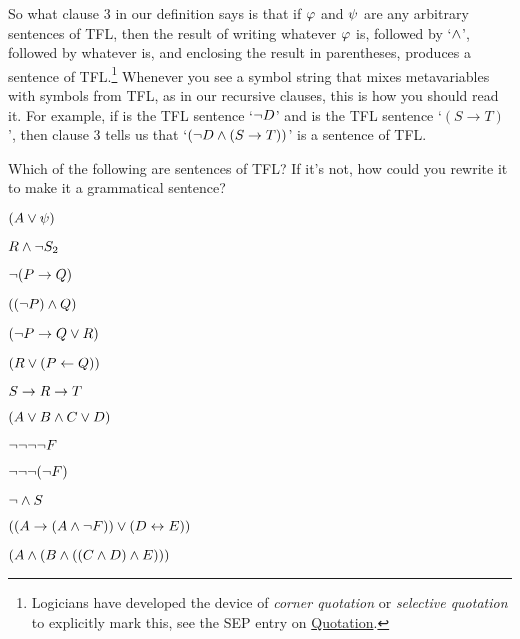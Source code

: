 
So what clause 3 in our definition says is that if $\mathcal{\varphi}$ and $\mathcal{\psi}$ are any arbitrary sentences of TFL, then the result of writing whatever $\mathcal{\varphi}$ is, followed by `$\wedge$', followed by whatever \meta{\psi} is, and enclosing the result in parentheses, produces a sentence of TFL.\footnote{Logicians have developed the device of \emph{corner quotation} or \emph{selective quotation} to explicitly mark this, see the SEP entry on \href{https://plato.stanford.edu/entries/quotation/}{Quotation}.}   Whenever you see a symbol string that mixes metavariables with symbols from TFL, as in our recursive clauses, this is how you should read it.   For example, if \meta{\varphi} is the TFL sentence `$\neg D$' and \meta{\psi} is the TFL sentence `$(S \rightarrow T)$', then clause 3 tells us that `$(\neg D \wedge (S \rightarrow T))$' is a sentence of TFL.  %

\practiceproblems
\problempart
\label{pr.wiffTFL}
Which of the following are sentences of TFL?  If it's not, how could you rewrite it to make it a grammatical sentence?
\begin{earg}
\item $(A\vee \mathcal{\psi})$
\item $R \wedge \neg S_2$
\item $\neg (P \rightarrow Q)$
\item $((\neg P) \wedge Q)$
\item $(\neg  P \rightarrow Q \vee R)$
\item $(R \vee (P \leftarrow Q))$
\item $S \rightarrow R \rightarrow T$
\item $(A \vee B  \wedge C \vee D)$
\item $\neg \neg \neg \neg F$
\item $\neg \neg \neg (\neg F)$
\item $\neg \wedge S$
\item $((A \rightarrow (A \wedge \neg F)) \vee (D \leftrightarrow E))$
\item $(A \wedge (B \wedge ((C \wedge D) \wedge E)))$

\end{earg}

